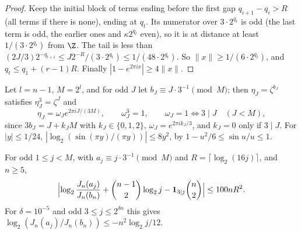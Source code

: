 \begin{proof}
Keep the initial block of terms ending before the first gap $q_{i+1}-q_i>R$
(all terms if there is none), ending at $q_t$. Its numerator over $3\cdot
2^{q_t}$ is odd (the last term is odd, the earlier ones and $\kappa2^{q_t}$
even), so it is at distance at least $1/(3\cdot2^{q_t})$ from $\Z$. The tail
is less than $(2J/3)2^{-q_{t+1}}\le J2^{-R}/(3\cdot2^{q_t})\le
1/(48\cdot2^{q_t})$. So $\|x\|\ge1/(6\cdot2^{q_t})$, and $q_t\le q_1+(r-1)R$.
Finally $|1-e^{2\pi ix}|\ge4\|x\|$.
\end{proof}

Let $l=n-1$, $M=2^l$, and for odd $J$ let $b_J\equiv J\cdot3^{-1}\pmod M$; then
$\eta_J=\zeta^{b_J}$ satisfies $\eta_J^3=\zeta^J$ and
\begin{equation}\label{eq:cuberoot}
 \eta_J=\omega_Je^{2\pi iJ/(3M)},\qquad\omega_J^3=1,\qquad
 \omega_J=1\iff3\mid J\quad(J<M),
\end{equation}
since $3b_J=J+k_JM$ with $k_J\in\{0,1,2\}$, $\omega_J=e^{2\pi ik_J/3}$, and
$k_J=0$ only if $3\mid J$. For $|y|\le1/24$,
$|\log_2(\sin(\pi y)/(\pi y))|\le8y^2$, by $1-u^2/6\le\sin u/u\le1$.

\begin{proposition}\label{prop:near}
For odd $1\le j<M$, with $a_j\equiv j\cdot3^{-1}\pmod M$ and
$R=\lceil\log_2(16j)\rceil$, and $n\ge5$,
\begin{equation}\label{eq:near}
 \Bigl|\log_2\frac{J_n(a_j)}{J_n(b_n)}+\binom{n-1}2\log_2j
 -\mathbf1_{3\mid j}\binom n2\Bigr|\le100nR^2 .
\end{equation}
For $\delta=10^{-5}$ and odd $3\le j\le2^{\delta n}$ this gives
$\log_2(J_n(a_j)/J_n(b_n))\le-n^2\log_2j/12$.
\end{proposition}


